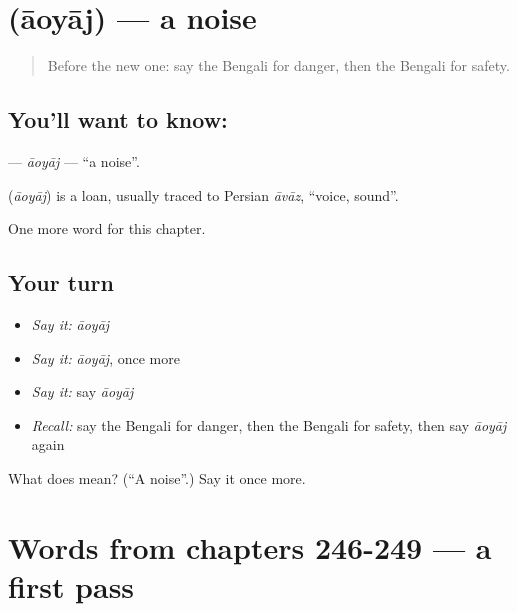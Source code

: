 \section[\texorpdfstring{\bn{আওয়াজ} (āoyāj)}{আওয়াজ (āoyāj)}]{ (āoyāj) — a noise}

\label{lesson:BN-C254-aoyaj}



\begin{quote}
Before the new one: say the Bengali for danger, then the Bengali for safety.
\end{quote}

\subsection*{You'll want to know: }
\textbf{} — \emph{āoyāj} — \textquotedblleft{}a noise\textquotedblright{}.

\begin{cousinweb}
\textbf{} (\emph{āoyāj}) is a loan, usually traced to Persian \emph{āvāz}, \textquotedblleft{}voice, sound\textquotedblright{}.
\end{cousinweb}

\begin{grammarlens}[title={What you've built}]
One more word for this chapter.
\end{grammarlens}

\subsection*{Your turn}
\begin{itemize}
\raggedright
  \item \emph{Say it:} \emph{āoyāj}
  \item \emph{Say it:} \emph{āoyāj}, once more
  \item \emph{Say it:} say \emph{āoyāj}
  \item \emph{Recall:} say the Bengali for danger, then the Bengali for safety, then say \emph{āoyāj} again
\end{itemize}

\begin{tcolorbox}[breakable,colback=teal!4,colframe=teal!35!black,title={Before you move on}]
What does  mean? (\textquotedblleft{}A noise\textquotedblright{}.) Say it once more.
\end{tcolorbox}
\section[(dialogue)]{Words from chapters 246-249 — a first pass}

